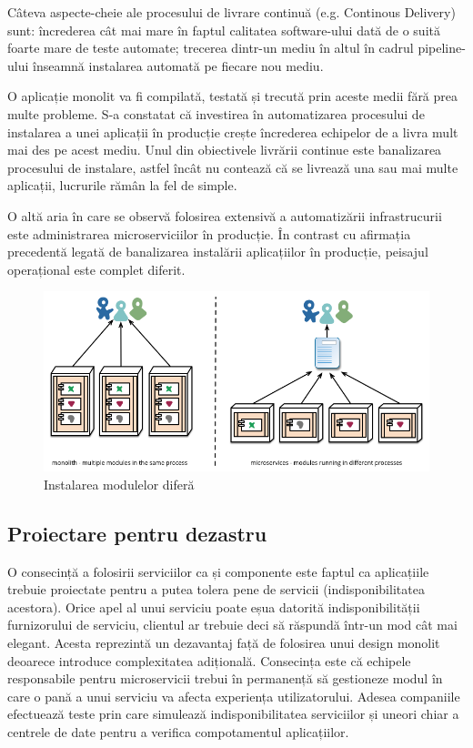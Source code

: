 \documentclass[12pt, a4paper, oneside, romanian]{teza-upb}
\begin{document}
Câteva aspecte-cheie ale procesului de livrare continuă (e.g. Continous Delivery) sunt: încrederea cât mai mare în faptul calitatea software-ului dată de o suită foarte mare de teste automate; trecerea dintr-un mediu în altul în cadrul pipeline-ului înseamnă instalarea automată pe fiecare nou mediu. 

O aplicație monolit va fi compilată, testată și trecută prin aceste medii fără prea multe probleme. S-a constatat că investirea în automatizarea procesului de instalarea a unei aplicații în producție crește încrederea echipelor de a livra mult mai des pe acest mediu. Unul din obiectivele livrării continue este banalizarea procesului de instalare, astfel încât nu contează că se livrează una sau mai multe aplicații, lucrurile rămân la fel de simple. 

O altă aria în care se observă folosirea extensivă a automatizării infrastrucurii este administrarea microserviciilor în producție. În contrast cu afirmația precedentă legată de banalizarea instalării aplicațiilor în producție, peisajul operațional este complet diferit. 

\begin{figure}[ht]
\centering
\includegraphics[scale=0.6]{img/micro-deployment.png}
\caption{Instalarea modulelor diferă}
\label{fig:arhi_componente}
\end{figure}

\subsection{Proiectare pentru dezastru}

O consecință a folosirii serviciilor ca și componente este faptul ca aplicațiile trebuie proiectate pentru a putea tolera pene de servicii (indisponibilitatea acestora). Orice apel al unui serviciu poate eșua datorită indisponibilității furnizorului de serviciu, clientul ar trebuie deci să răspundă într-un mod cât mai elegant. Acesta reprezintă un dezavantaj față de folosirea unui design monolit deoarece introduce complexitatea adițională. Consecința este că echipele responsabile pentru microservicii trebui în permanență să gestioneze modul în care o pană a unui serviciu va afecta experiența utilizatorului. Adesea companiile efectuează teste prin care simulează indisponibilitatea serviciilor și uneori chiar a centrele de date pentru a verifica compotamentul aplicațiilor. 
\end{document}
